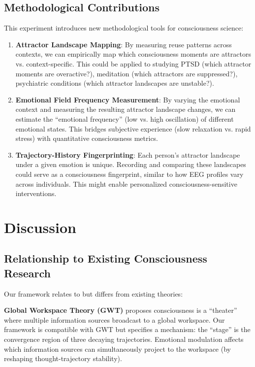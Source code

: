 \documentclass[12pt,a4paper]{article}
\theoremstyle{definition}
\begin{document}
\subsection{Methodological Contributions}

This experiment introduces new methodological tools for consciousness science:

\begin{enumerate}
  \item \textbf{Attractor Landscape Mapping}: By measuring reuse patterns across contexts, we can empirically map which consciousness moments are attractors vs. context-specific. This could be applied to studying PTSD (which attractor moments are overactive?), meditation (which attractors are suppressed?), psychiatric conditions (which attractor landscapes are unstable?).

  \item \textbf{Emotional Field Frequency Measurement}: By varying the emotional context and measuring the resulting attractor landscape changes, we can estimate the ``emotional frequency'' (low vs. high oscillation) of different emotional states. This bridges subjective experience (slow relaxation vs. rapid stress) with quantitative consciousness metrics.

  \item \textbf{Trajectory-History Fingerprinting}: Each person's attractor landscape under a given emotion is unique. Recording and comparing these landscapes could serve as a consciousness fingerprint, similar to how EEG profiles vary across individuals. This might enable personalized consciousness-sensitive interventions.
\end{enumerate}

\section{Discussion}

\subsection{Relationship to Existing Consciousness Research}

Our framework relates to but differs from existing theories:

\textbf{Global Workspace Theory (GWT)} \cite{baars} proposes consciousness is a ``theater'' where multiple information sources broadcast to a global workspace. Our framework is compatible with GWT but specifies a mechanism: the ``stage'' is the convergence region of three decaying trajectories. Emotional modulation affects which information sources can simultaneously project to the workspace (by reshaping thought-trajectory stability).
\end{document}
